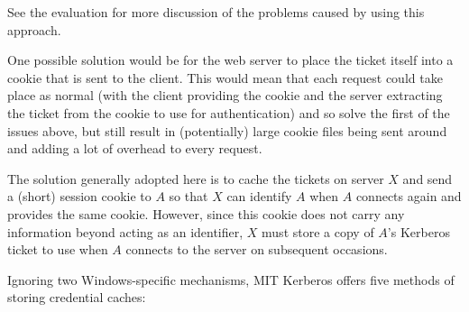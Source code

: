 \documentclass{article}
\begin{document}
See the evaluation for more discussion of the problems caused by using this approach.

One possible solution would be for the web server to place the ticket itself into a cookie that is sent to the client. This would mean that each request could take place as normal (with the client providing the cookie and the server extracting the ticket from the cookie to use for authentication) and so solve the first of the issues above, but still result in (potentially) large cookie files being sent around and adding a lot of overhead to every request.

The solution generally adopted here is to cache the tickets on server $X$ and send a (short) session cookie to $A$ so that $X$ can identify $A$ when $A$ connects again and provides the same cookie. However, since this cookie does not carry any information beyond acting as an identifier, $X$ must store a copy of $A$'s Kerberos ticket to use when $A$ connects to the server on subsequent occasions.

Ignoring two Windows-specific mechanisms, MIT Kerberos offers five methods of storing credential caches\cite{MIT-ccache-types}:
\end{document}
